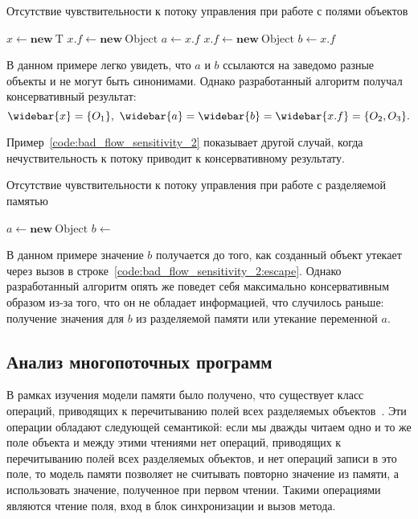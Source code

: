 \documentclass[14pt,titlepage,draft]{extarticle}
\newcommand{\java}{\eng{Java}\xspace}
\newcommand{\type}[1]{\mathrm{#1}}
\newcommand{\op}[1]{\mathbf{#1}}
\newcommand{\pts}[1]{\widebar{#1}}
\begin{document}
      \begin{algorithm}
        \caption{Отсутствие чувствительности к потоку управления при работе с
          полями объектов}
        \label{code:bad_flow_sensitivity_1}
        \begin{algorithmic}[1]
          \State $x \gets \op{new}~\type{T}$
          \State $x.f \gets \op{new}~\type{Object}$
          \State $a \gets x.f$
          \State $x.f \gets \op{new}~\type{Object}$
          \State $b \gets x.f$
        \end{algorithmic}
      \end{algorithm}

      В данном примере легко увидеть, что $a$ и $b$ ссылаются на заведомо
      разные объекты и не могут быть синонимами. Однако разработанный алгоритм
      получал консервативный результат:
      \[ \pts{x} = \{O_1\},\ \pts{a} = \pts{b} = \pts{x.f} = \{O_2, O_3\}. \]

      Пример~\ref{code:bad_flow_sensitivity_2} показывает другой случай, когда
      нечуствительность к потоку приводит к консервативному результату.

      \begin{algorithm}
        \caption{Отсутствие чувствительности к потоку управления при работе с
          разделяемой памятью}
        \label{code:bad_flow_sensitivity_2}
        \begin{algorithmic}[1]
          \State $a \gets \op{new}~\type{Object}$
          \State $b \gets$ 
          \State {}
            \label{code:bad_flow_sensitivity_2:escape}
        \end{algorithmic}
      \end{algorithm}

      В данном примере значение $b$ получается до того, как созданный объект
      утекает через вызов в строке~\ref{code:bad_flow_sensitivity_2:escape}.
      Однако разработанный алгоритм опять же поведет себя максимально
      консервативным образом из-за того, что он не обладает информацией, что
      случилось раньше: получение значения для $b$ из разделяемой памяти или
      утекание переменной $a$.

    \subsection{Анализ многопоточных программ}
      
      В рамках изучения модели памяти \java было получено, что существует
      класс операций, приводящих к перечитыванию полей всех разделяемых
      объектов~\cite[раздел~5.3.1]{my_bachelor}. Эти операции обладают
      следующей семантикой: если мы дважды читаем одно и то же поле объекта и
      между этими чтениями нет операций, приводящих к перечитыванию полей всех
      разделяемых объектов, и нет операций записи в это поле, то модель памяти
      позволяет не считывать повторно значение из памяти, а использовать
      значение, полученное при первом чтении. Такими операциями являются
      чтение  поля, вход в блок синхронизации и вызов метода.
\end{document}
